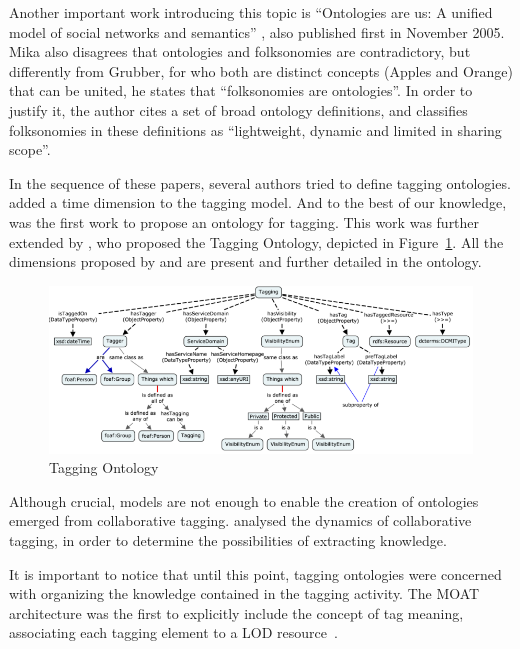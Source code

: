 Another important work introducing this topic is ``Ontologies are us: A unified model of social networks and semantics'' \cite{Mika2007}, also published first in November 2005.
Mika also disagrees that ontologies and folksonomies are contradictory, but differently from Grubber, for who both are distinct concepts (Apples and Orange) that can be united, he states that ``folksonomies are ontologies''.
In order to justify it, the author cites a set of broad ontology definitions, and classifies folksonomies in these definitions as ``lightweight, dynamic and limited in sharing scope''.

In the sequence of these papers, several authors tried to define tagging ontologies.
 added a time dimension to the tagging model.
And to the best of our knowledge,  was the first work to propose an ontology for tagging.
This work was further extended by , who proposed the Tagging Ontology, depicted in Figure~\ref{fig:tagging_ontology}.
All the dimensions proposed by  and  are present and further detailed in the ontology.

\begin{figure}[tb]
\begin{center}
\includegraphics[width=\columnwidth]{images/tagging_ontology.png}
\caption{Tagging Ontology~\cite{Knerr2006} }
\label{fig:tagging_ontology}
\end{center}
\end{figure}

Although crucial, models are not enough to enable the creation of ontologies emerged from collaborative tagging.
 analysed the dynamics of collaborative tagging, in order to determine the possibilities of extracting knowledge.

It is important to notice that until this point, tagging ontologies were concerned with organizing the knowledge contained in the tagging activity.
The MOAT architecture was the first to explicitly include the concept of tag meaning, associating each tagging element to a LOD resource~\cite{Passant2008}.

